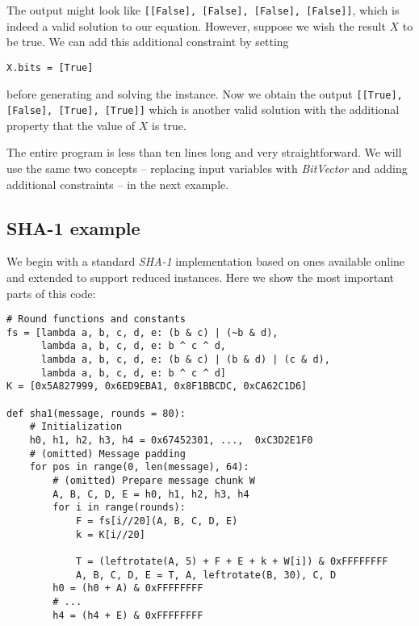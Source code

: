 The output might look like \texttt{[[False], [False], [False], [False]]}, which is indeed a valid solution to our equation.
However, suppose we wish the result $X$ to be true.
We can add this additional constraint by setting

\begin{verbatim}
X.bits = [True]
\end{verbatim}

before generating and solving the instance.
Now we obtain the output \texttt{[[True], [False], [True], [True]]} which is another valid solution with the additional property that the value of $X$ is true.

The entire program is less than ten lines long and very straightforward.
We will use the same two concepts -- replacing input variables with \emph{BitVector} and adding additional constraints -- in the next example.

\subsection{SHA-1 example}
We begin with a standard \emph{SHA-1} implementation based on ones available online and extended to support reduced instances.
Here we show the most important parts of this code:

\begin{verbatim}
# Round functions and constants
fs = [lambda a, b, c, d, e: (b & c) | (~b & d),
      lambda a, b, c, d, e: b ^ c ^ d,
      lambda a, b, c, d, e: (b & c) | (b & d) | (c & d),
      lambda a, b, c, d, e: b ^ c ^ d]
K = [0x5A827999, 0x6ED9EBA1, 0x8F1BBCDC, 0xCA62C1D6]

def sha1(message, rounds = 80):
    # Initialization
    h0, h1, h2, h3, h4 = 0x67452301, ...,  0xC3D2E1F0
    # (omitted) Message padding
    for pos in range(0, len(message), 64):
        # (omitted) Prepare message chunk W
        A, B, C, D, E = h0, h1, h2, h3, h4
        for i in range(rounds):
            F = fs[i//20](A, B, C, D, E)
            k = K[i//20]

            T = (leftrotate(A, 5) + F + E + k + W[i]) & 0xFFFFFFFF
            A, B, C, D, E = T, A, leftrotate(B, 30), C, D
        h0 = (h0 + A) & 0xFFFFFFFF
        # ...        
        h4 = (h4 + E) & 0xFFFFFFFF
\end{verbatim}

